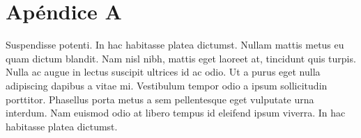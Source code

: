 
\chapter{Apéndice A}
\label{chap:appendix_publications}

\ifpdf
    \graphicspath{{appendix_publications/figures/PNG/}{appendix_publications/figures/PDF/}{appendix_publications/figures/}}
\else
    \graphicspath{{appendix_publications/figures/EPS/}{appendix_publications/figures/}}
\fi



Suspendisse potenti. In hac habitasse platea dictumst. Nullam mattis metus eu
quam dictum blandit. Nam nisl nibh, mattis eget laoreet at, tincidunt quis
turpis. Nulla ac augue in lectus suscipit ultrices id ac odio. Ut a purus eget
nulla adipiscing dapibus a vitae mi. Vestibulum tempor odio a ipsum sollicitudin
porttitor. Phasellus porta metus a sem pellentesque eget vulputate urna
interdum. Nam euismod odio at libero tempus id eleifend ipsum viverra. In hac
habitasse platea dictumst.

